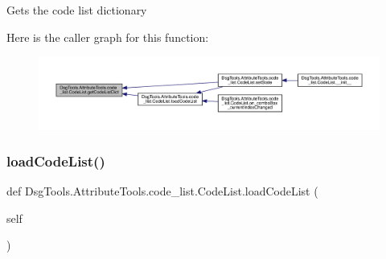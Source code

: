 \begin{DoxyVerb}Gets the code list dictionary
\end{DoxyVerb}
 Here is the caller graph for this function\+:
\nopagebreak
\begin{figure}[H]
\begin{center}
\leavevmode
\includegraphics[width=350pt]{class_dsg_tools_1_1_attribute_tools_1_1code__list_1_1_code_list_ac8a5029bd39e2d9d9b23deb2954cd5a9_icgraph}
\end{center}
\end{figure}
\mbox{\label{class_dsg_tools_1_1_attribute_tools_1_1code__list_1_1_code_list_a64dfeb9a4e4a4930377640ad21f9f7d2}} 
\subsubsection{\texorpdfstring{load\+Code\+List()}{loadCodeList()}}
{\footnotesize\ttfamily def Dsg\+Tools.\+Attribute\+Tools.\+code\+\_\+list.\+Code\+List.\+load\+Code\+List (\begin{DoxyParamCaption}\item[{}]{self }\end{DoxyParamCaption})}

